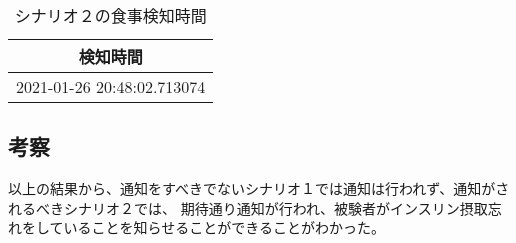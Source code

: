 \begin{table}[htbp]
  \caption{シナリオ２の食事検知時間}
  \label{tb:scenario_2_meal_detect}
  \begin{center}
    \begin{tabular}{|c|}
      \hline
      検知時間 \\
      \hline\hline
      2021-01-26 20:48:02.713074 \\\hline
    \end{tabular}
  \end{center}
\end{table}

\subsection{考察}

以上の結果から、通知をすべきでないシナリオ１では通知は行われず、通知がされるべきシナリオ２では、
期待通り通知が行われ、被験者がインスリン摂取忘れをしていることを知らせることができることがわかった。


